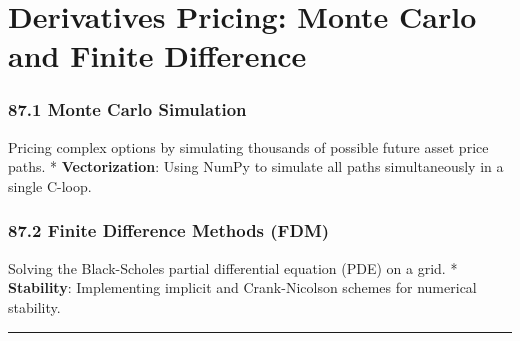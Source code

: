 \hypertarget{derivatives-pricing-monte-carlo-and-finite-difference}{%
\chapter{Derivatives Pricing: Monte Carlo and Finite
Difference}\label{derivatives-pricing-monte-carlo-and-finite-difference}}

\hypertarget{monte-carlo-simulation}{%
\subsection{87.1 Monte Carlo Simulation}\label{monte-carlo-simulation}}

Pricing complex options by simulating thousands of possible future asset
price paths. * \textbf{Vectorization}: Using NumPy to simulate all paths
simultaneously in a single C-loop.

\hypertarget{finite-difference-methods-fdm}{%
\subsection{87.2 Finite Difference Methods
(FDM)}\label{finite-difference-methods-fdm}}

Solving the Black-Scholes partial differential equation (PDE) on a grid.
* \textbf{Stability}: Implementing implicit and Crank-Nicolson schemes
for numerical stability.

\begin{center}\rule{0.5\linewidth}{0.5pt}\end{center}
